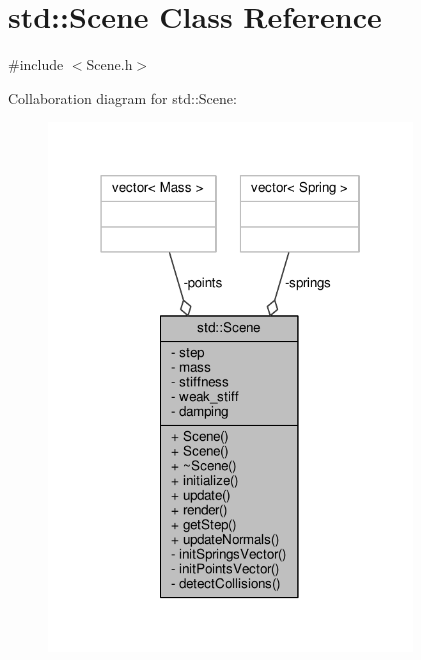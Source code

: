 \hypertarget{classstd_1_1Scene}{}\section{std\+:\+:Scene Class Reference}
\label{classstd_1_1Scene}


{\ttfamily \#include $<$Scene.\+h$>$}



Collaboration diagram for std\+:\+:Scene\+:\nopagebreak
\begin{figure}[H]
\begin{center}
\leavevmode
\includegraphics[width=274pt]{classstd_1_1Scene__coll__graph}
\end{center}
\end{figure}
